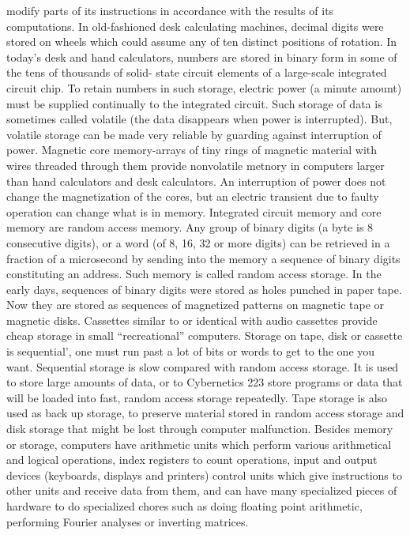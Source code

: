 {{{{{{{{{{{modify parts of its instructions in accordance with the results of
its computations.
In old-fashioned desk calculating machines, decimal digits were
stored on wheels which could assume any of ten distinct positions
of rotation. In today’s desk and hand calculators, numbers are
stored in binary form in some of the tens of thousands of solid-
state circuit elements of a large-scale integrated circuit chip. To
retain numbers in such storage, electric power (a minute amount)
must be supplied continually to the integrated circuit. Such storage
of data is sometimes called volatile (the data disappears when
power is interrupted). But, volatile storage can be made very reliable
by guarding against interruption of power.
Magnetic core memory-arrays of tiny rings of magnetic material
with wires threaded through them provide nonvolatile metnory in
computers larger than hand calculators and desk calculators. An
interruption of power does not change the magnetization of the
cores, but an electric transient due to faulty operation can change
what is in memory.
Integrated circuit memory and core memory are random access
memory. Any group of binary digits (a byte is 8 consecutive digits),
or a word (of 8, 16, 32 or more digits) can be retrieved in a fraction
of a microsecond by sending into the memory a sequence of
binary digits constituting an address. Such memory is called
random access storage.
In the early days, sequences of binary digits were stored as holes
punched in paper tape. Now they are stored as sequences of
magnetized patterns on magnetic tape or magnetic disks. Cassettes
similar to or identical with audio cassettes provide cheap storage
in small “recreational” computers. Storage on tape, disk or cassette
is sequential', one must run past a lot of bits or words to get to the
one you want. Sequential storage is slow compared with random
access storage. It is used to store large amounts of data, or to
Cybernetics
223
store programs or data that will be loaded into fast, random
access storage repeatedly. Tape storage is also used as back up
storage, to preserve material stored in random access storage and
disk storage that might be lost through computer malfunction.
Besides memory or storage, computers have arithmetic units
which perform various arithmetical and logical operations, index
registers to count operations, input and output devices (keyboards,
displays and printers) control units which give instructions to other
units and receive data from them, and can have many specialized
pieces of hardware to do specialized chores such as doing floating
point arithmetic, performing Fourier analyses or inverting matrices.
}}}}}}}}}}}
